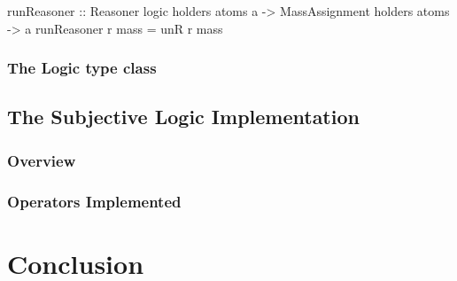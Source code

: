 \documentclass[a4paper]{report}
\begin{document}
\begin{code}
  runReasoner :: Reasoner logic holders atoms a
              -> MassAssignment holders atoms
              -> a
  runReasoner r mass = unR r mass
\end{code}





\subsection{The Logic type class}



\section{The Subjective Logic Implementation}

\subsection{Overview}

\subsection{Operators Implemented}








\chapter{Conclusion}
\label{chap:conclusion}






\end{document}
